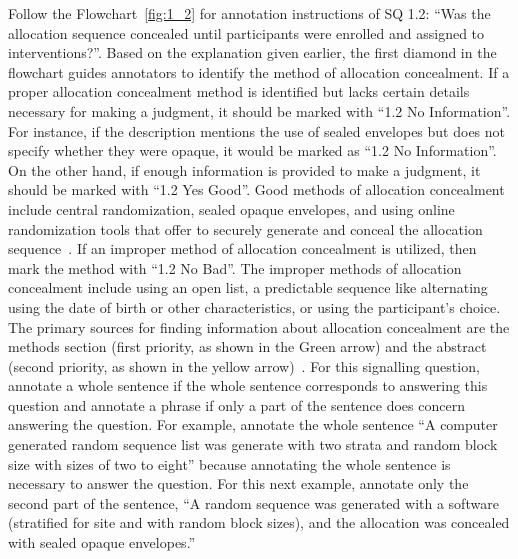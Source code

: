 \documentclass[sn-mathphys,Numbered]{sn-jnl}%
\begin{document}
Follow the Flowchart~\ref{fig:1_2} for annotation instructions of SQ 1.2: ``Was the allocation sequence concealed until participants were enrolled and assigned to interventions?''.
Based on the explanation given earlier, the first diamond in the flowchart guides annotators to identify the method of allocation concealment.
If a proper allocation concealment method is identified but lacks certain details necessary for making a judgment, it should be marked with ``1.2 No Information''.
For instance, if the description mentions the use of sealed envelopes but does not specify whether they were opaque, it would be marked as ``1.2 No Information''.
On the other hand, if enough information is provided to make a judgment, it should be marked with ``1.2 Yes Good''.
Good methods of allocation concealment include central randomization, sealed opaque envelopes, and using online randomization tools that offer to securely generate and conceal the allocation sequence~\cite{sterne2019rob}.
If an improper method of allocation concealment is utilized, then mark the method with ``1.2 No Bad''.
The improper methods of allocation concealment include using an open list, a predictable sequence like alternating using the date of birth or other characteristics, or using the participant's choice.
The primary sources for finding information about allocation concealment are the methods section (first priority, as shown in the Green arrow) and the abstract (second priority, as shown in the yellow arrow)~\cite{sterne2019rob,rahim2021effect}.
For this signalling question, annotate a whole sentence if the whole sentence corresponds to answering this question and annotate a phrase if only a part of the sentence does concern answering the question.
For example, annotate the whole sentence ``A computer generated random sequence list was generate with two strata and random block size with sizes of two to eight'' because annotating the whole sentence is necessary to answer the question.
For this next example, annotate only the second part of the sentence, ``A random sequence was generated with a software (stratified for site and with random block sizes), and the allocation was concealed with sealed opaque envelopes.''
%
%
%
\end{document}
